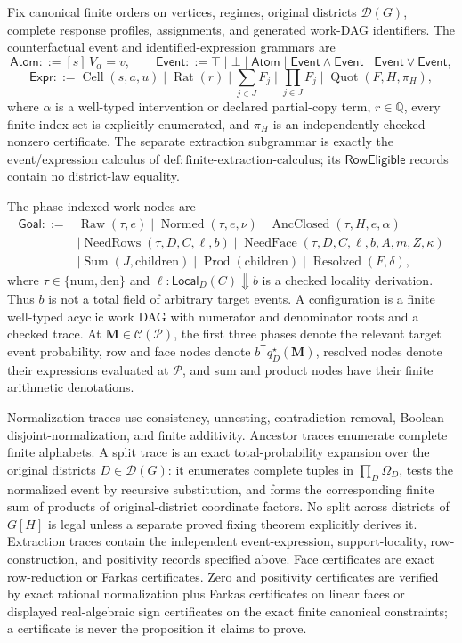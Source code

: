 Fix canonical finite orders on vertices, regimes, original districts \(\mathcal D(G)\), complete response profiles, assignments, and generated work-DAG identifiers.  The counterfactual event and identified-expression grammars are
\[
\mathsf{Atom}::=[s]\,V_\alpha=v,
\qquad
\mathsf{Event}::=\top\mid\bot\mid\mathsf{Atom}\mid
\mathsf{Event}\wedge\mathsf{Event}\mid\mathsf{Event}\vee\mathsf{Event},
\]
\[
\mathsf{Expr}::=\operatorname{Cell}(s,a,u)\mid\operatorname{Rat}(r)
\mid\sum_{j\in J}F_j\mid\prod_{j\in J}F_j
\mid\operatorname{Quot}(F,H,\pi_H),
\]
where \(\alpha\) is a well-typed intervention or declared partial-copy term, \(r\in\mathbb Q\), every finite index set is explicitly enumerated, and \(\pi_H\) is an independently checked nonzero certificate.  The separate extraction subgrammar is exactly the event/expression calculus of \(\mathrm{def:finite\text{-}extraction\text{-}calculus}\); its \(\mathsf{RowEligible}\) records contain no district-law equality.

The phase-indexed work nodes are
\[
\begin{split}
\mathsf{Goal}::={}&\operatorname{Raw}(\tau,e)
\mid\operatorname{Normed}(\tau,e,\nu)
\mid\operatorname{AncClosed}(\tau,H,e,\alpha)\\
&\mid\operatorname{NeedRows}(\tau,D,C,\ell,b)
\mid\operatorname{NeedFace}(\tau,D,C,\ell,b,A,m,Z,\kappa)\\
&\mid\operatorname{Sum}(J,\mathrm{children})
\mid\operatorname{Prod}(\mathrm{children})
\mid\operatorname{Resolved}(F,\delta),
\end{split}
\]
where \(\tau\in\{\mathrm{num},\mathrm{den}\}\) and \(\ell:\mathsf{Local}_D(C)\Downarrow b\) is a checked locality derivation.  Thus \(b\) is not a total field of arbitrary target events.  A configuration is a finite well-typed acyclic work DAG with numerator and denominator roots and a checked trace.  At \(\mathbf M\in\mathcal C(\mathcal P)\), the first three phases denote the relevant target event probability, row and face nodes denote \(b^{\mathsf T}q_D^\star(\mathbf M)\), resolved nodes denote their expressions evaluated at \(\mathcal P\), and sum and product nodes have their finite arithmetic denotations.

Normalization traces use consistency, unnesting, contradiction removal, Boolean disjoint-normalization, and finite additivity.  Ancestor traces enumerate complete finite alphabets.  A split trace is an exact total-probability expansion over the original districts \(D\in\mathcal D(G)\): it enumerates complete tuples in \(\prod_D\Omega_D\), tests the normalized event by recursive substitution, and forms the corresponding finite sum of products of original-district coordinate factors.  No split across districts of \(G[H]\) is legal unless a separate proved fixing theorem explicitly derives it.  Extraction traces contain the independent event-expression, support-locality, row-construction, and positivity records specified above.  Face certificates are exact row-reduction or Farkas certificates.  Zero and positivity certificates are verified by exact rational normalization plus Farkas certificates on linear faces or displayed real-algebraic sign certificates on the exact finite canonical constraints; a certificate is never the proposition it claims to prove.

